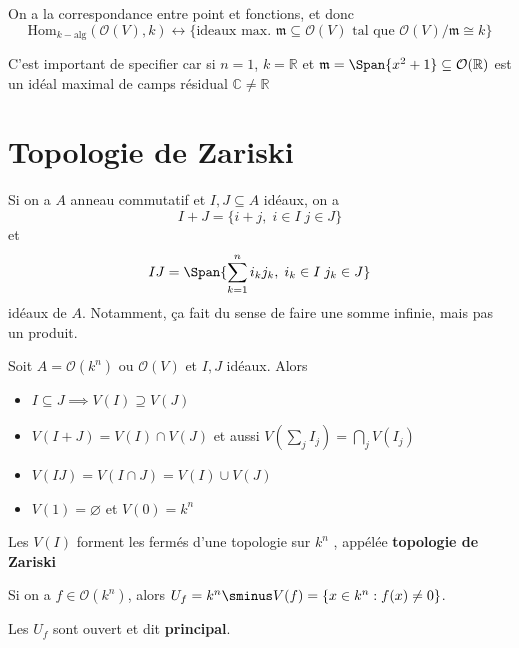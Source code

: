 \begin{remark}{}
    On a la correspondance entre point et fonctions, et donc
    \[
      \mathrm{Hom}_{k-\text{alg}} {(\mathcal{O}{(V)}, k)} \leftrightarrow
      \{\text{ideaux max. }\mathfrak{m} \subseteq \mathcal{O}{(V)} \text{ tal que }
      \mathcal{O}{(V)} / \mathfrak{m} \cong k\}
    \]
\end{remark}

\begin{example}{}
    C'est important de specifier car si \(n = 1\), \(k = \mathbb{R}\) et
    \(\mathfrak{m} = \Span{x^2 + 1} \subseteq \mathcal{O}{(\mathbb{R})} \) est
    un idéal maximal de camps résidual \(\mathbb{C} \neq \mathbb{R}\) 
\end{example}

\section{Topologie de Zariski}

Si on a \(A\) anneau commutatif et \(I, J \subseteq A \) idéaux, on a
\[
  I + J = \{ i + j, \; i \in I \; j \in J\} 
\]
et 
\[
  IJ = \Span{\sum_{k=1}^{n} i_k j_k, \; i_k \in I \; j_k \in J } 
\]
idéaux de \(A\). Notamment, ça fait du sense de faire une somme infinie, mais
pas un produit. 

\begin{lemma}{}
    Soit \(A = \mathcal{O}{(k^{n})} \text{ ou } \mathcal{O}{(V)}\) et \(I, J\)
    idéaux. Alors

\begin{itemize}
    \item \(I \subseteq J \implies  V{(I)} \supseteq V{(J)}  \) 
    \item \(V{(I + J)} = V{(I)} \cap V{(J)}\) et aussi \(V{\left( \sum_{j} I_j \right)} = \bigcap_{j} V{(I_j)}\) 
    \item \(V{(IJ)} = V{(I \cap J)} = V{(I)} \cup V{(J)}\) 
    \item \(V{(1)} = \varnothing\) et \(V{(0)} = k^{n}\) 
\end{itemize}
\end{lemma}

\begin{corollary}{}
    Les \(V{(I)}\) forment les fermés d'une topologie sur \(k^{n}\) , appélée
    \textbf{topologie de Zariski}
\end{corollary}


\begin{definition}{}
    Si on a \(f \in \mathcal{O}{(k^{n})}\), alors \(U_f = k^{n} \sminus V{(f)} =
    \{x \in k^{n} : f{(x)} \neq 0\} \).

    Les \(U_f\) sont ouvert et dit \textbf{principal}.
\end{definition}

